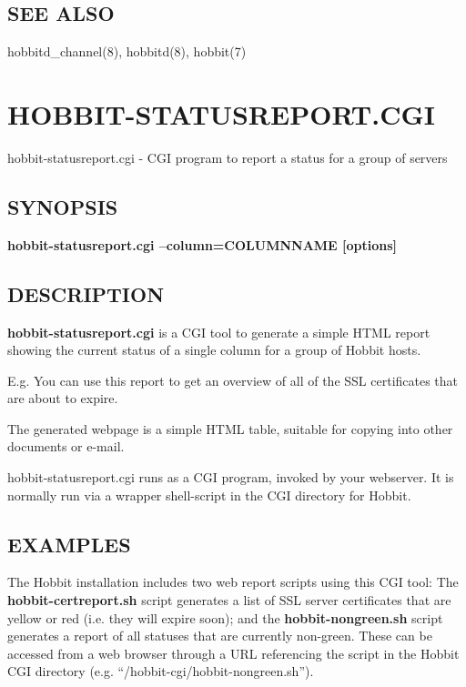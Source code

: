 \subsection{SEE ALSO}
hobbitd\_channel(8), hobbitd(8), hobbit(7) 

 
%
\newpage
\section{HOBBIT-STATUSREPORT.CGI}

 hobbit-statusreport.cgi - CGI program to report a status for a group
 of servers
 \subsection{SYNOPSIS}
\textbf{hobbit-statusreport.cgi --column=COLUMNNAME [options]}


 
\subsection{DESCRIPTION}
\textbf{hobbit-statusreport.cgi} is a CGI tool to generate a simple
HTML report showing the current status of a single column for a group
of Hobbit hosts. 


  E.g. You can use this report to get an overview of all of the SSL certificates that are about to expire. 


  The generated webpage is a simple HTML table, suitable for copying into other documents or e-mail. 


  hobbit-statusreport.cgi runs as a CGI program, invoked by your webserver. It is normally run via a wrapper shell-script in the CGI directory for Hobbit. 


 
\subsection{EXAMPLES}
 The Hobbit installation includes two web report scripts using this
 CGI tool: The \textbf{hobbit-certreport.sh} script generates a list
 of SSL server certificates that are yellow or red (i.e. they will
 expire soon); and the \textbf{hobbit-nongreen.sh} script generates a
 report of all statuses that are currently non-green. These can be
 accessed from a web browser through a URL referencing the script in
 the Hobbit CGI directory (e.g. ``/hobbit-cgi/hobbit-nongreen.sh''). 


